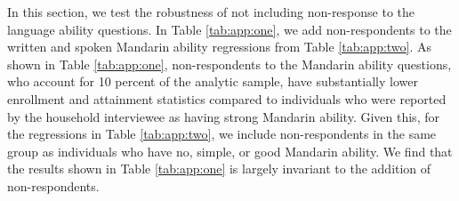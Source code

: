 In this section, we test the robustness of not including non-response to the language ability questions. In Table \ref{tab:app:one}, we add non-respondents to the written and spoken Mandarin ability regressions from Table \ref{tab:app:two}. As shown in Table \ref{tab:app:one}, non-respondents to the Mandarin ability questions, who account for 10 percent of the analytic sample, have substantially lower enrollment and attainment statistics compared to individuals who were reported by the household interviewee as having strong Mandarin ability. Given this, for the regressions in Table \ref{tab:app:two}, we include non-respondents in the same group as individuals who have no, simple, or good Mandarin ability. We find that the results shown in Table \ref{tab:app:one} is largely invariant to the addition of non-respondents.

\blindtext


